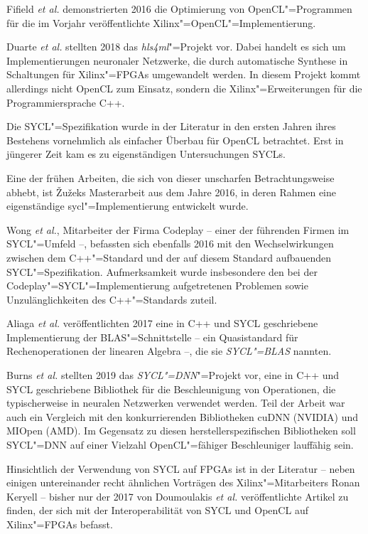 Fifield \textit{et al.} demonstrierten 2016 die Optimierung von
OpenCL"=Programmen für die im Vorjahr veröffentlichte
Xilinx"=OpenCL"=Implementierung. \cite[vgl.][]{fifield2016}

Duarte \textit{et al.} stellten 2018 das \textit{hls4ml}"=Projekt vor. Dabei
handelt es sich um Implementierungen neuronaler Netzwerke, die durch automatische
Synthese in Schaltungen für Xilinx"=FPGAs umgewandelt werden. In diesem Projekt
kommt allerdings nicht OpenCL zum Einsatz, sondern die Xilinx"=Erweiterungen für
die Programmiersprache C++. \cite[vgl.][]{duarte2018}

Die SYCL"=Spezifikation wurde in der Literatur in den ersten Jahren ihres
Bestehens vornehmlich als einfacher Überbau für OpenCL betrachtet. Erst in
jüngerer Zeit kam es zu eigenständigen Untersuchungen SYCLs.

Eine der frühen Arbeiten, die sich von dieser unscharfen Betrachtungsweise
abhebt, ist Žužeks Masterarbeit aus dem Jahre 2016, in deren Rahmen eine
eigenständige \gls{sycl}"=Implementierung entwickelt wurde.
\cite[vgl.][]{zuzek2016}

Wong \textit{et al.}, Mitarbeiter der Firma Codeplay -- einer der führenden
Firmen im SYCL"=Umfeld --, befassten sich ebenfalls 2016 mit den
Wechselwirkungen zwischen dem C++"=Standard und der auf diesem Standard
aufbauenden SYCL"=Spezifikation. Aufmerksamkeit wurde insbesondere den bei der
Codeplay"=SYCL"=Implementierung aufgetretenen Problemen sowie Unzulänglichkeiten
des C++"=Standards zuteil.
\cite[vgl.][]{wong2016}

Aliaga \textit{et al.} veröffentlichten 2017 eine in C++ und SYCL geschriebene
Implementierung der BLAS"=Schnittstelle -- ein Quasistandard für
Rechenoperationen der linearen Algebra --, die sie \textit{SYCL"=BLAS} nannten.
\cite[vgl.][]{aliaga2017}

Burns \textit{et al.} stellten 2019 das \textit{SYCL"=DNN}"=Projekt vor, eine in
C++ und SYCL geschriebene Bibliothek für die Beschleunigung von Operationen, die
typischerweise in neuralen Netzwerken verwendet werden. Teil der Arbeit war auch
ein Vergleich mit den konkurrierenden Bibliotheken cuDNN (NVIDIA) und
MIOpen (AMD). Im Gegensatz zu diesen herstellerspezifischen Bibliotheken soll
SYCL"=DNN auf einer Vielzahl OpenCL"=fähiger Beschleuniger lauffähig sein.
\cite[vgl.][]{burns2019}

Hinsichtlich der Verwendung von SYCL auf FPGAs ist in der Literatur -- neben
einigen untereinander recht ähnlichen Vorträgen des Xilinx"=Mitarbeiters Ronan
Keryell -- bisher nur der 2017 von Doumoulakis \textit{et al.} veröffentlichte
Artikel zu finden, der sich mit der Interoperabilität von SYCL und OpenCL auf
Xilinx"=FPGAs befasst.
\cite[vgl.][]{doumoulakis2017}

